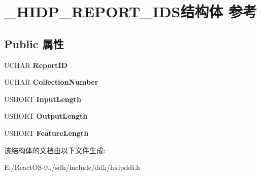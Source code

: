 \hypertarget{struct___h_i_d_p___r_e_p_o_r_t___i_d_s}{}\section{\+\_\+\+H\+I\+D\+P\+\_\+\+R\+E\+P\+O\+R\+T\+\_\+\+I\+D\+S结构体 参考}
\label{struct___h_i_d_p___r_e_p_o_r_t___i_d_s}
\subsection*{Public 属性}
\begin{DoxyCompactItemize}
\item 
\mbox{\label{struct___h_i_d_p___r_e_p_o_r_t___i_d_s_a85455164e5707ebef585f4c218cf7411}} 
U\+C\+H\+AR {\bfseries Report\+ID}
\item 
\mbox{\label{struct___h_i_d_p___r_e_p_o_r_t___i_d_s_a730acc263d57b2520f856caba55ab2b5}} 
U\+C\+H\+AR {\bfseries Collection\+Number}
\item 
\mbox{\label{struct___h_i_d_p___r_e_p_o_r_t___i_d_s_a00f260a5b8c50d3db62e4762d9b305f1}} 
U\+S\+H\+O\+RT {\bfseries Input\+Length}
\item 
\mbox{\label{struct___h_i_d_p___r_e_p_o_r_t___i_d_s_a33d5311313de9913fc5e8589df13bb34}} 
U\+S\+H\+O\+RT {\bfseries Output\+Length}
\item 
\mbox{\label{struct___h_i_d_p___r_e_p_o_r_t___i_d_s_a511df4da35f01e0dddbee3a51e3b2b82}} 
U\+S\+H\+O\+RT {\bfseries Feature\+Length}
\end{DoxyCompactItemize}


该结构体的文档由以下文件生成\+:\begin{DoxyCompactItemize}
\item 
E\+:/\+React\+O\+S-\/0../sdk/include/ddk/hidpddi.\+h\end{DoxyCompactItemize}
